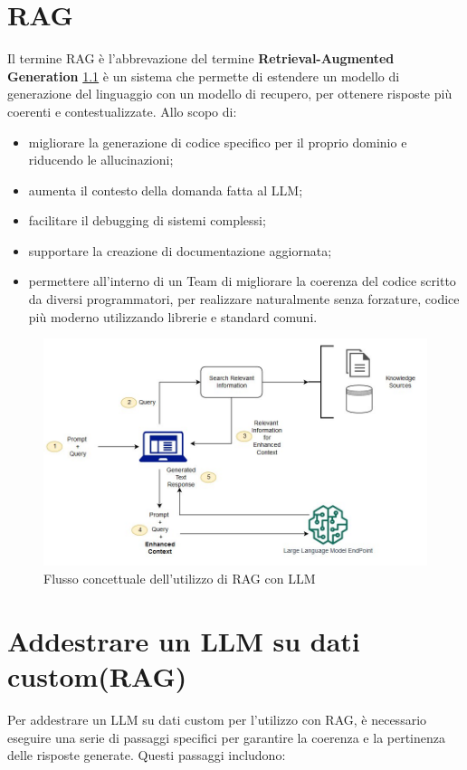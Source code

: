 \documentclass[12pt,a4paper,openright,twoside]{book}
\begin{document}
\chapter{RAG}
Il termine RAG è l'abbrevazione del termine \textbf{Retrieval-Augmented Generation} \cref{fig:jumpstart-fm-rag.jpg} è un sistema che permette di estendere un modello di generazione del linguaggio con un modello di recupero, per ottenere risposte più coerenti e contestualizzate.
Allo scopo di:
\begin{itemize}
    \item migliorare la generazione di codice specifico per il proprio dominio e riducendo le allucinazioni;
    \item aumenta il contesto della domanda fatta al LLM;
    \item facilitare il debugging di sistemi complessi;
    \item supportare la creazione di documentazione aggiornata;
    \item permettere all'interno di un Team di migliorare la coerenza del codice scritto da diversi programmatori, per realizzare naturalmente senza forzature, codice più moderno utilizzando librerie e standard comuni.
\end{itemize}


\begin{figure}
    \centering
    \includegraphics[width=.8\linewidth]{figures/jumpstart-fm-rag.jpg}
    \caption{Flusso concettuale dell'utilizzo di RAG con LLM}
    \label{fig:jumpstart-fm-rag.jpg}
\end{figure}


\chapter{Addestrare un LLM su dati custom(RAG)}
Per addestrare un LLM su dati custom per l'utilizzo con RAG, è necessario eseguire una serie di passaggi specifici per garantire la coerenza e la pertinenza delle risposte generate. Questi passaggi includono:
\end{document}

